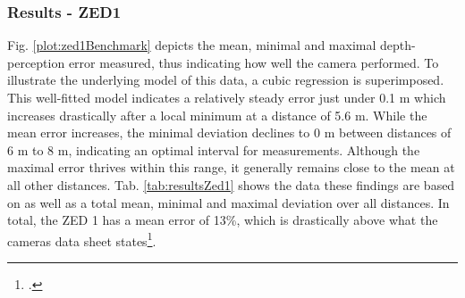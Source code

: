 \subsubsection{Results - ZED1}

Fig. \ref{plot:zed1Benchmark} depicts the mean, minimal and maximal depth-perception error measured, thus indicating how well the camera performed.
To illustrate the underlying model of this data, a cubic regression is superimposed. This well-fitted model indicates a relatively steady error just under 0.1 m which increases drastically after a local minimum at a distance of 5.6 m. 
While the mean error increases, the minimal deviation declines to 0 m between distances of 6 m to 8 m, indicating an optimal interval for measurements. Although the maximal error thrives within this range, it generally remains close to the mean at all other distances.
Tab. \ref{tab:resultsZed1} shows the data these findings are based on as well as a total mean, minimal and maximal deviation over all distances. 
In total, the ZED 1 has a mean error of 13\%, which is drastically above what the cameras data sheet states\footcite{zed1Datasheet}.

%
%



